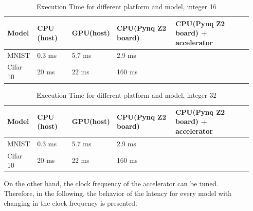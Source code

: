 \begin{center}
\begin{table}[!htbp]
\centering
\captionsetup{justification=centering}
\begin{tabular}{ |p{2.5cm}||p{2.5cm}|p{2.5cm}|p{2.5cm}|p{2.5cm}| }
\hline
Model & CPU (host)\protect\footnotemark[1] & GPU(host)\protect\footnotemark[2] & CPU(Pynq Z2 board)\protect\footnotemark[3] & CPU(Pynq Z2 board) + accelerator \\
\hline
MNIST & 0.3 ms & 5.7 ms & 2.9 ms  & \\
\hline
Cifar 10& 20 ms & 22 ms& 160 ms &\\
\hline
\end{tabular}
\caption{Execution Time for different platform and model, integer 16}
\label{table:moplatint16}
\end{table}
\end{center}
\begin{center}
\begin{table}[!htbp]
\centering
\captionsetup{justification=centering}
\begin{tabular}{ |p{2.5cm}||p{2.5cm}|p{2.5cm}|p{2.5cm}|p{2.5cm}| }
\hline
Model & CPU (host)\protect\footnotemark[1] & GPU(host)\protect\footnotemark[2] & CPU(Pynq Z2 board)\protect\footnotemark[3] & CPU(Pynq Z2 board) + accelerator \\
\hline
MNIST & 0.3 ms & 5.7 ms & 2.9 ms  & \\
\hline
Cifar 10& 20 ms & 22 ms& 160 ms &\\
\hline
\end{tabular}
\caption{Execution Time for different platform and model, integer 32}
\label{table:moplatint32}
\end{table}
\end{center}



On the other hand, the clock frequency of the accelerator can be tuned. Therefore, in the following, the behavior of the latency for every model with changing in the clock frequency is presented.

\newpage

